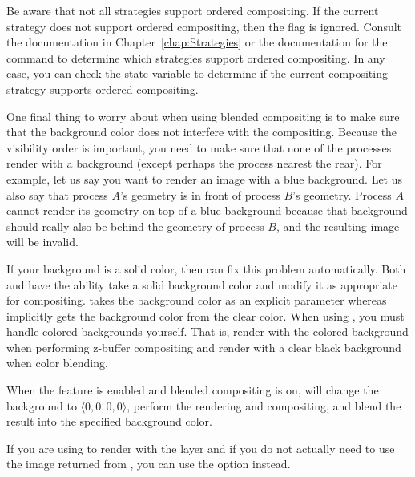 Be aware that not all strategies support ordered compositing.  If the
current strategy does not support ordered compositing, then the
 flag is ignored.  Consult the
documentation in Chapter~\ref{chap:Strategies} or the documentation for the
 command to determine which strategies support ordered
compositing.  In any case, you can check the
 state variable to determine if
the current compositing strategy supports ordered compositing.



One final thing to worry about when using blended compositing is to make
sure that the background color does not interfere with the compositing.
Because the visibility order is important, you need to make sure that none
of the processes render with a background (except perhaps the process
nearest the rear).  For example, let us say you want to render an image
with a blue background.  Let us also say that process $A$'s geometry is in
front of process $B$'s geometry.  Process $A$ cannot render its geometry on
top of a blue background because that background should really also be
behind the geometry of process $B$, and the resulting image will be
invalid.

If your background is a solid color, then \IceT can fix this problem
automatically.  Both  and  have
the ability take a solid background color and modify it as appropriate for
compositing.   takes the background color as an
explicit parameter whereas  implicitly gets the
background color from the \OpenGL clear color. When using
, you must handle colored backgrounds
yourself. That is, render with the colored background when performing
z-buffer compositing and render with a clear black background when color
blending.

When the  feature is enabled and
blended compositing is on, \IceT will change the background to $\langle 0,
0, 0, 0 \rangle$, perform the rendering and compositing, and blend the
result into the specified background color.

If you are using  to render with the \OpenGL layer
and if you do not actually need to use the image returned from
, you can use the
 option instead.

